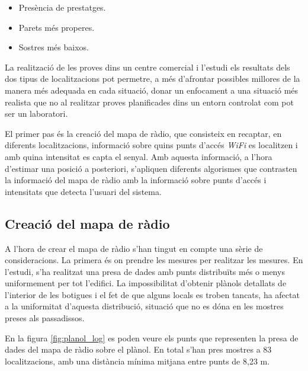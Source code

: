\begin{itemize}
    \item Presència de prestatges.
    \item Parets més properes.
    \item Sostres més baixos.
\end{itemize}

La realització de les proves dins un centre comercial i l'estudi els resultats dels dos tipus de localitzacions pot permetre, a més d'afrontar possibles millores de la manera més adequada en cada situació, donar un enfocament a una situació més realista que no al realitzar proves planificades dins un entorn controlat com pot ser un laboratori.

El primer pas és la creació del mapa de ràdio, que consisteix en recaptar, en diferents localitzacions, informació sobre quins punts d'accés \textit{WiFi} es localitzen i amb quina intensitat es capta el senyal. Amb aquesta informació, a l'hora d'estimar una posició a posteriori, s'apliquen diferents algorismes que contrasten la informació del mapa de ràdio amb la informació sobre punts d'accés i intensitats que detecta l'usuari del sistema.

\subsection{Creació del mapa de ràdio}

A l'hora de crear el mapa de ràdio s'han tingut en compte una sèrie de consideracions. La primera és on prendre les mesures per realitzar les mesures. En l'estudi, s'ha realitzat una presa de dades amb punts distribuïts més o menys uniformement per tot l'edifici. La impossibilitat d'obtenir plànols detallats de l'interior de les botigues i el fet de que alguns locals es troben tancats, ha afectat a la uniformitat d'aquesta distribució, situació que no es dóna en les mostres preses als passadissos.

En la figura \ref{fig:planol_log} es poden veure els punts que representen la presa de dades del mapa de ràdio sobre el plànol. En total s'han pres mostres a 83 localitzacions, amb una distància mínima mitjana entre punts de 8,23 m.

